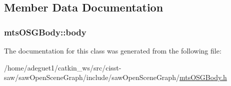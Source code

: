 \subsection{Member Data Documentation}
\hypertarget{classmts_o_s_g_body_ae3a847023812fbfa11686c769d97f34e}{
\subsubsection[{body}]{ mts\-O\-S\-G\-Body\-::body\hspace{0.3cm}{\ttfamily [protected]}}}\label{classmts_o_s_g_body_ae3a847023812fbfa11686c769d97f34e}


The documentation for this class was generated from the following file\-:\begin{DoxyCompactItemize}
\item 
/home/adeguet1/catkin\-\_\-ws/src/cisst-\/saw/saw\-Open\-Scene\-Graph/include/saw\-Open\-Scene\-Graph/\hyperlink{mts_o_s_g_body_8h}{mts\-O\-S\-G\-Body.\-h}\end{DoxyCompactItemize}
